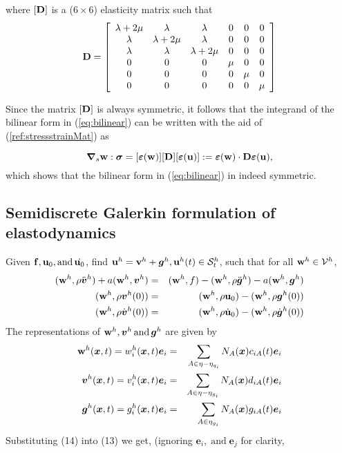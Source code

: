 \documentclass[10pt]{article}
\newcommand{\tmmathbf}[1]{\ensuremath{\boldsymbol{#1}}}
\newcommand{\tmop}[1]{\ensuremath{\operatorname{#1}}}
\begin{document}
where $[\mathbf{D}]$ is a ($6\times6$) elasticity matrix such that
\begin{equation}
  \mathbf{D}= \left[ \begin{array}{cccccc}
    \lambda + 2 \mu & \lambda & \lambda & 0 & 0 & 0\\
    \lambda & \lambda + 2 \mu & \lambda & 0 & 0 & 0\\
    \lambda & \lambda & \lambda + 2 \mu & 0 & 0 & 0\\
    0 & 0 & 0 & \mu & 0 & 0\\
    0 & 0 & 0 & 0 & \mu & 0\\
    0 & 0 & 0 & 0 & 0 & \mu
  \end{array} \right]
\end{equation}

Since the matrix $[\mathbf{D}]$ is always symmetric, it follows that the integrand of the bilinear form in (\ref{eq:bilinear}) can be written with the aid of (\ref{ref:stressstrainMat}) as

\[
{\boldsymbol{\nabla}}_s\mathbf{w}:{\boldsymbol{\sigma}} = [{\boldsymbol{\varepsilon}}(\mathbf{w})][\mathbf{D}][{\boldsymbol{\varepsilon}}(\mathbf{u})] := {\boldsymbol{\varepsilon}}(\mathbf{w})\cdot\mathbf{D}{\boldsymbol{\varepsilon}}(\mathbf{u}) ,
\]
which shows that the bilinear form in (\ref{eq:bilinear}) in indeed symmetric. 

\subsection{Semidiscrete Galerkin formulation of elastodynamics}

Given $\force, \bu_0, \tmop{and} \dot{\bu_0}$, find $\bu^h =\bv^h
+\tmmathbf{g}^h,\bu^h ( t ) \in \mathcal{S}_t^h$, such that for all
$\mathbf{w}^h \in \mathcal{V}^h$,
\begin{eqnarray}
  (\bw^h, \rho \ddot{\tmmathbf{v}}^h ) + a
  (\bw^h,\tmmathbf{v}^h ) & = & (\bw^h, f ) 
- (\bw^h, \rho \ddot{\tmmathbf{g}}^h ) - a (\bw^h,\tmmathbf{g}^h ) \nonumber\\
  (\bw^h, \rho \tmmathbf{v}^h ( 0 ) ) & = & (\bw^h, \rho
  \bu_0 ) - (\bw^h, \rho \tmmathbf{g}^h ( 0 ) ) \nonumber\\
  (\bw^h, \rho \dot{\tmmathbf{v}}^h ( 0 ) ) & = & (\bw^h,
  \rho \dot{\bu}_0 ) - (\bw^h, \rho \dot{\tmmathbf{g}}^h ( 0
  ) ) 
\end{eqnarray}
The representations of $\bw^h,\tmmathbf{v}^h \tmop{and}
\tmmathbf{g}^h$ are given by
\begin{eqnarray}
  \bw^h (\tmmathbf{x}, t ) = w_i^h (\tmmathbf{x}, t )\tmmathbf{e}_i &
  = & \sum_{A \in \eta - \eta_{q_i}} N_A (\tmmathbf{x}) c_{i A} ( t
  )\tmmathbf{e}_i \nonumber\\
  \tmmathbf{v}^h (\tmmathbf{x}, t ) = v_i^h (\tmmathbf{x}, t )\tmmathbf{e}_i &
  = & \sum_{A \in \eta - \eta_{g_i}} N_A (\tmmathbf{x}) d_{i A} ( t
  )\tmmathbf{e}_i \nonumber\\
  \tmmathbf{g}^h (\tmmathbf{x}, t ) = g_i^h (\tmmathbf{x}, t )\tmmathbf{e}_i &
  = & \sum_{A \in \eta_{g_i}} N_A (\tmmathbf{x}) g_{i A} ( t )\tmmathbf{e}_i 
\end{eqnarray}
Substituting (14) into (13) we get, (ignoring $\tmmathbf{e}_i, \tmop{and}
\tmmathbf{e}_j$ for clarity,
\end{document}
